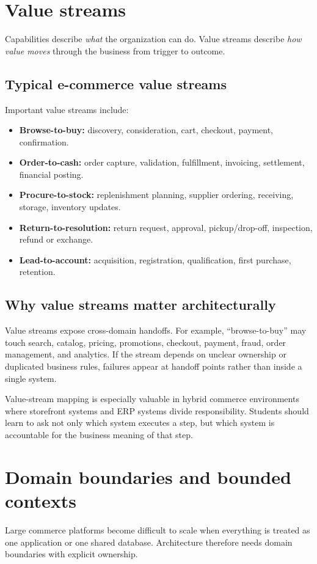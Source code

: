 \section{Value streams}
Capabilities describe \emph{what} the organization can do.
Value streams describe \emph{how value moves} through the business from trigger to outcome.

\subsection{Typical e-commerce value streams}
Important value streams include:
\begin{itemize}
  \item \textbf{Browse-to-buy:} discovery, consideration, cart, checkout, payment, confirmation.
  \item \textbf{Order-to-cash:} order capture, validation, fulfillment, invoicing, settlement, financial posting.
  \item \textbf{Procure-to-stock:} replenishment planning, supplier ordering, receiving, storage, inventory updates.
  \item \textbf{Return-to-resolution:} return request, approval, pickup/drop-off, inspection, refund or exchange.
  \item \textbf{Lead-to-account:} acquisition, registration, qualification, first purchase, retention.
\end{itemize}

\subsection{Why value streams matter architecturally}
Value streams expose cross-domain handoffs.
For example, ``browse-to-buy'' may touch search, catalog, pricing, promotions, checkout, payment, fraud, order management, and analytics.
If the stream depends on unclear ownership or duplicated business rules, failures appear at handoff points rather than inside a single system.

Value-stream mapping is especially valuable in hybrid commerce environments where storefront systems and ERP systems divide responsibility.
Students should learn to ask not only which system executes a step, but which system is accountable for the business meaning of that step.

\section{Domain boundaries and bounded contexts}
Large commerce platforms become difficult to scale when everything is treated as one application or one shared database.
Architecture therefore needs domain boundaries with explicit ownership.

